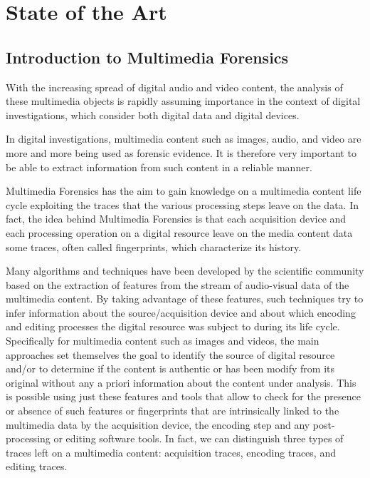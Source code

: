\chapter{State of the Art}

\section{Introduction to Multimedia Forensics}

With the increasing spread of digital audio and video content, the analysis of these multimedia objects is rapidly assuming importance in the context of digital investigations, which consider both digital data and digital devices.

In digital investigations, multimedia content such as images, audio, and video are more and more being used as forensic evidence. It is therefore very important to be able to extract information from such content in a reliable manner.

Multimedia Forensics has the aim to gain knowledge on a multimedia content life cycle exploiting the traces that the various processing steps leave on the data. In fact, the idea behind Multimedia Forensics is that each acquisition device and each processing operation on a digital resource leave on the media content data some traces, often called fingerprints, which characterize its history.

Many algorithms and techniques have been developed by the scientific community based on the extraction of features from the stream of audio-visual data of the multimedia content. By taking advantage of these features, such techniques try to infer information about the source/acquisition device and about which encoding and editing processes the digital resource was subject to during its life cycle. Specifically for multimedia content such as images and videos, the main approaches set themselves the goal to identify the source of digital resource and/or to determine if the content is authentic or has been modify from its original without any a priori information about the content under analysis. This is possible using just these features and tools that allow to check for the presence or absence of such features or fingerprints that are intrinsically linked to the multimedia data by the acquisition device, the encoding step and any post-processing or editing software tools. In fact, we can distinguish three types of traces left on a multimedia content: acquisition traces, encoding traces, and editing traces.

